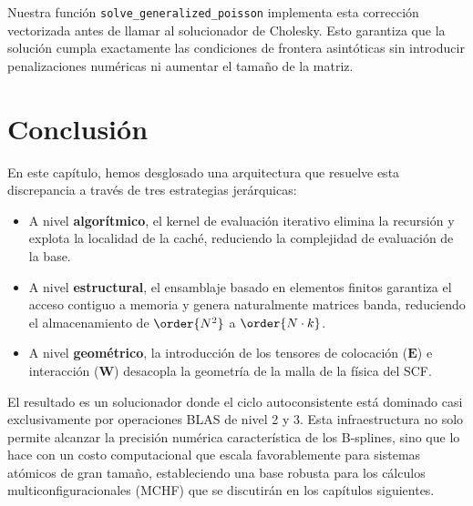 Nuestra función \texttt{solve\_generalized\_poisson} implementa esta corrección vectorizada antes de llamar al solucionador de Cholesky. Esto garantiza que la solución cumpla exactamente las condiciones de frontera asintóticas sin introducir penalizaciones numéricas ni aumentar el tamaño de la matriz.

\section{Conclusión}

En este capítulo, hemos desglosado una arquitectura que resuelve esta discrepancia a través de tres estrategias jerárquicas:

\begin{itemize}
    \item A nivel \textbf{algorítmico}, el kernel de evaluación iterativo elimina la recursión y explota la localidad de la caché, reduciendo la complejidad de evaluación de la base.
    \item A nivel \textbf{estructural}, el ensamblaje basado en elementos finitos garantiza el acceso contiguo a memoria y genera naturalmente matrices banda, reduciendo el almacenamiento de \( \order{N^2} \) a \( \order{N \cdot k} \).
    \item A nivel \textbf{geométrico}, la introducción de los tensores de colocación (\(\bm{E}\)) e interacción (\(\mathbf{W}\)) desacopla la geometría de la malla de la física del SCF.
\end{itemize}

El resultado es un solucionador donde el ciclo autoconsistente está dominado casi exclusivamente por operaciones BLAS de nivel 2 y 3. Esta infraestructura no solo permite alcanzar la precisión numérica característica de los B-splines, sino que lo hace con un costo computacional que escala favorablemente para sistemas atómicos de gran tamaño, estableciendo una base robusta para los cálculos multiconfiguracionales (MCHF) que se discutirán en los capítulos siguientes.


